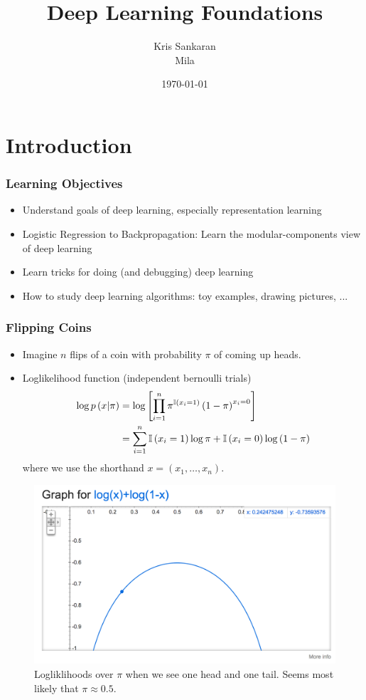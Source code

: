 \documentclass[10pt,mathserif]{beamer}
\title{\large \bfseries Deep Learning Foundations}
\author{Kris Sankaran\\[3ex] Mila}
\date{\today}
\begin{document}
\maketitle

\section{Introduction}
\label{sec:introduction}

\begin{frame}
  \frametitle{Learning Objectives}
  \begin{itemize}
    \item Understand goals of deep learning, especially representation learning
    \item Logistic Regression to Backpropagation: Learn the modular-components
      view of deep learning
    \item Learn tricks for doing (and debugging) deep learning
    \item How to study deep learning algorithms: toy examples,
      drawing pictures, ...
  \end{itemize}
\end{frame}

\begin{frame}
  \frametitle{Flipping Coins}
  \begin{itemize}
  \item Imagine $n$ flips of a coin with probability $\pi$ of coming up heads.
  \item Loglikelihood function (independent bernoulli trials)
    \begin{align*}
      \log p\left(x \vert \pi \right) &= \log \left[\prod_{i = 1}^{n} \pi^{\mathbb{I}\left({x_i = 1}\right)}\left(1 - \pi\right)^{x_i = 0}\right] \\
      &= \sum_{i = 1}^{n} \mathbb{I}\left({x_i = 1}\right)\log \pi + \mathbb{I}\left({x_i = 0}\right)\log\left(1 - \pi\right)
    \end{align*}
    where we use the shorthand $x = \left(x_1, \dots, x_n\right)$.
  \end{itemize}
  \begin{figure}[ht]
    \centering
    \includegraphics[width=0.3\paperwidth]{figure/loglikelihood_bernoulli}
    \caption{Logliklihoods over $\pi$ when we see one head and one tail. Seems
      most likely that $\pi \approx 0.5$. \label{fig:loglikelihood_bernoulli} }
  \end{figure}
\end{frame}
\end{document}

